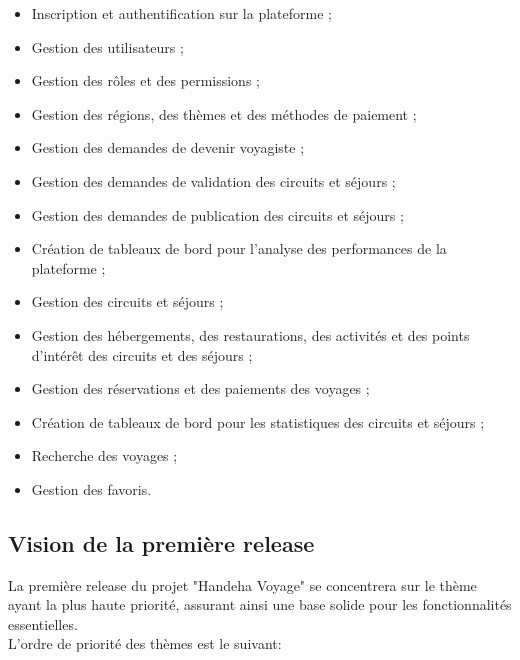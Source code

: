 \documentclass[12pt]{report}
\begin{document}
				\begin{itemize}
					\item Inscription et authentification sur la plateforme ;
					\item Gestion des utilisateurs ;
					\item Gestion des rôles et des permissions ;
					\item Gestion des régions, des thèmes et des méthodes de paiement ;
					\item Gestion des demandes de devenir voyagiste ;
					\item Gestion des demandes de validation des circuits et séjours ;
					\item Gestion des demandes de publication des circuits et séjours ;
					\item Création de tableaux de bord pour l'analyse des performances de la plateforme ;
					\item Gestion des circuits et séjours ;
					\item Gestion des hébergements, des restaurations, des activités et des points d'intérêt des circuits et des séjours ;
					\item Gestion des réservations et des paiements des voyages ;
					\item Création de tableaux de bord pour les statistiques des circuits et séjours ;
					\item Recherche des voyages ;
					\item Gestion des favoris.
				\end{itemize}

				\subsection{Vision de la première release}

				\hspace{15pt} La première release du projet "Handeha Voyage" se concentrera sur le thème ayant la plus haute priorité, assurant ainsi une base solide pour les fonctionnalités essentielles.\\

				L'ordre de priorité des thèmes est le suivant:
\end{document}
